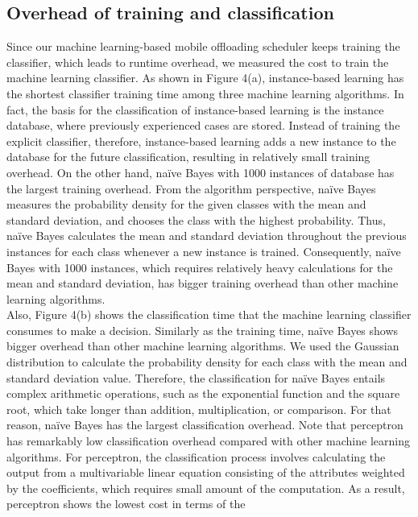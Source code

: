 \documentclass[10pt, conference, compsocconf]{IEEEtran}
\begin{document}
{{\subsection{Overhead of training and classification}
%
Since our machine learning-based mobile offloading scheduler keeps
training the classifier, which leads to runtime overhead, we
measured the cost to train the machine learning classifier.
%
As shown in Figure 4(a), instance-based learning has the shortest
classifier training time among three machine learning algorithms.  
%
In fact, the basis for the classification of instance-based learning is
the instance database, where previously experienced cases are stored.
%
Instead of training the explicit classifier, therefore, instance-based
learning adds a new instance to the database for the future
classification, resulting in relatively small training overhead.
%
On the other hand, na\"{i}ve Bayes with 1000 instances of database has
the largest training overhead. 
%
From the algorithm perspective, na\"{i}ve Bayes measures the
probability density for the given classes with the mean and standard
deviation, and chooses the class with the highest probability.
%
Thus, na\"{i}ve Bayes calculates the mean and standard deviation
throughout the previous instances for each class whenever a new instance
is trained.
%
Consequently, na\"{i}ve Bayes with 1000 instances, which requires
relatively heavy calculations for the mean and standard deviation, has
bigger training overhead than other machine learning algorithms.\\
%
\indent Also, Figure 4(b) shows the classification time that the machine
learning classifier consumes to make a decision.
%
Similarly as the training time, na\"{i}ve Bayes shows bigger overhead
than other machine learning algorithms.
%
We used the Gaussian distribution to calculate the probability
density for each class with the mean and standard deviation value.
%
Therefore, the classification for na\"{i}ve Bayes entails complex
arithmetic operations, such as the exponential function and the square
root, which take longer than addition, multiplication, or comparison.
%
For that reason, na\"{i}ve Bayes has the largest classification overhead.
%
Note that perceptron has remarkably low classification overhead compared
with other machine learning algorithms. 
%
For perceptron, the classification process involves calculating the
output from a multivariable linear equation consisting of the attributes
weighted by the coefficients, which requires small amount of
the computation. 
%
As a result, perceptron shows the lowest cost in terms of the
}}
\end{document}
